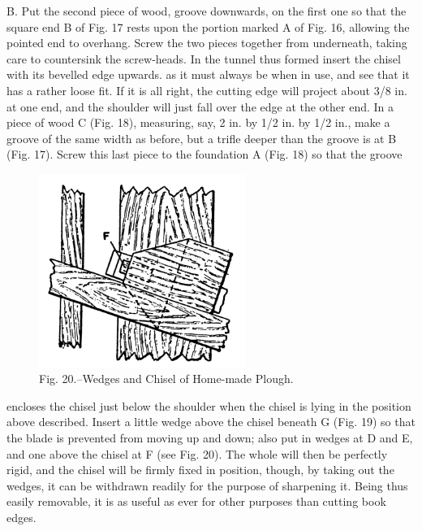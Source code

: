 \documentclass[twoside]{book}
\begin{document}
B. Put the second piece of wood, groove downwards,
on the first one so that the square end B of
Fig. 17 rests upon the portion marked A of Fig. 16,
allowing the pointed end to overhang. Screw the
two pieces together from underneath, taking care
\pagebreak
to countersink the screw-heads. In the tunnel thus
formed insert the chisel with its bevelled edge upwards.
as it must always be when in use, and see that it
has a rather loose fit. If it is all right, the cutting
edge will project about 3/8 in. at one end, and the
shoulder will just fall over the edge at the other
end. In a piece of wood C (Fig. 18), measuring,
say, 2 in. by 1/2 in. by 1/2 in., make a groove of the
same width as before, but a trifle deeper than the
groove is at B (Fig. 17). Screw this last piece to
the foundation A (Fig. 18) so that the groove
	\begin{figure}[h]
		\centering
		\includegraphics[width=0.6\textwidth]{Figures/_020.png}
		\caption*{Fig. 20.--Wedges and Chisel of Home-made Plough.}
	\end{figure}
encloses the chisel just below the shoulder when the
chisel is lying in the position above described.
Insert a little wedge above the chisel beneath G
(Fig. 19) so that the blade is prevented from moving
up and down; also put in wedges at D and E, and
one above the chisel at F (see Fig. 20). The whole
will then be perfectly rigid, and the chisel will be
firmly fixed in position, though, by taking out the
wedges, it can be withdrawn readily for the purpose
of sharpening it. Being thus easily removable, it
is as useful as ever for other purposes than cutting book edges.
\end{document}

